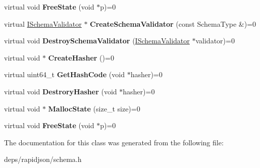 \begin{DoxyCompactItemize}
\item 
virtual void {\bfseries Free\+State} (void $\ast$p)=0\hypertarget{classinternal_1_1_i_schema_state_factory_a27bd2138940cac3c330dd8399c49b22b}{}\label{classinternal_1_1_i_schema_state_factory_a27bd2138940cac3c330dd8399c49b22b}

\item 
virtual \hyperlink{classinternal_1_1_i_schema_validator}{I\+Schema\+Validator} $\ast$ {\bfseries Create\+Schema\+Validator} (const Schema\+Type \&)=0\hypertarget{classinternal_1_1_i_schema_state_factory_ae8c98fcff6a057b4fcd9018fc14551a8}{}\label{classinternal_1_1_i_schema_state_factory_ae8c98fcff6a057b4fcd9018fc14551a8}

\item 
virtual void {\bfseries Destroy\+Schema\+Validator} (\hyperlink{classinternal_1_1_i_schema_validator}{I\+Schema\+Validator} $\ast$validator)=0\hypertarget{classinternal_1_1_i_schema_state_factory_a112cbf154077050bc30ffe670032442c}{}\label{classinternal_1_1_i_schema_state_factory_a112cbf154077050bc30ffe670032442c}

\item 
virtual void $\ast$ {\bfseries Create\+Hasher} ()=0\hypertarget{classinternal_1_1_i_schema_state_factory_a4ac37b9d3e9526004c82692473f978f4}{}\label{classinternal_1_1_i_schema_state_factory_a4ac37b9d3e9526004c82692473f978f4}

\item 
virtual uint64\+\_\+t {\bfseries Get\+Hash\+Code} (void $\ast$hasher)=0\hypertarget{classinternal_1_1_i_schema_state_factory_addfcf00963cc777edf642b204f07c8d6}{}\label{classinternal_1_1_i_schema_state_factory_addfcf00963cc777edf642b204f07c8d6}

\item 
virtual void {\bfseries Destrory\+Hasher} (void $\ast$hasher)=0\hypertarget{classinternal_1_1_i_schema_state_factory_a70b8d88180d2e6993105b17f19101635}{}\label{classinternal_1_1_i_schema_state_factory_a70b8d88180d2e6993105b17f19101635}

\item 
virtual void $\ast$ {\bfseries Malloc\+State} (size\+\_\+t size)=0\hypertarget{classinternal_1_1_i_schema_state_factory_ada92ebf8e9ef994f7e20a0f7f9750519}{}\label{classinternal_1_1_i_schema_state_factory_ada92ebf8e9ef994f7e20a0f7f9750519}

\item 
virtual void {\bfseries Free\+State} (void $\ast$p)=0\hypertarget{classinternal_1_1_i_schema_state_factory_a27bd2138940cac3c330dd8399c49b22b}{}\label{classinternal_1_1_i_schema_state_factory_a27bd2138940cac3c330dd8399c49b22b}

\end{DoxyCompactItemize}


The documentation for this class was generated from the following file\+:\begin{DoxyCompactItemize}
\item 
deps/rapidjson/schema.\+h\end{DoxyCompactItemize}
